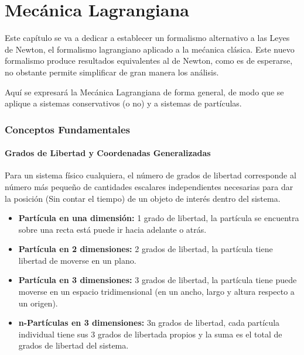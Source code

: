 \documentclass[/home/hernan-barquero/Documents/Apuntes_mecanica_teorica/main.tex]{subfiles}
\begin{document}
    \part{Mecánica Lagrangiana}

    Este capítulo se va a dedicar a establecer un formalismo alternativo a las Leyes de Newton, el formalismo lagrangiano aplicado a la mećanica clásica. Este nuevo formalismo produce resultados equivalentes al de Newton, como es de esperarse, no obstante permite simplificar de gran manera los análisis.

    Aquí se expresará la Mecánica Lagrangiana de forma general, de modo que se aplique a sistemas conservativos (o no) y a sistemas de partículas.

    \section{Conceptos Fundamentales}

    \subsection{Grados de Libertad y Coordenadas Generalizadas}

    \begin{definition}
        Para un sistema físico cualquiera, el número de grados de libertad corresponde al número más pequeño de cantidades escalares independientes necesarias para dar la posición (Sin contar el tiempo) de un objeto de interés dentro del sistema.

        \begin{itemize}
            \item \textbf{Partícula en una dimensión:} 1 grado de libertad, la partícula se encuentra sobre una recta está puede ir hacia adelante o atrás.
            \item \textbf{Partícula en 2 dimensiones:} 2 grados de libertad, la partícula tiene libertad de moverse en un plano.
            \item \textbf{Partícula en 3 dimensiones:} 3 grados de libertad, la partícula tiene puede moverse en un espacio tridimensional (en un ancho, largo y altura respecto a un origen).
            \item \textbf{n-Partículas en 3 dimensiones:} 3n grados de libertad, cada partícula individual tiene sus 3 grados de libertada propios y la suma es el total de grados de libertad del sistema.
        \end{itemize}
        
    \end{definition}
\end{document}
